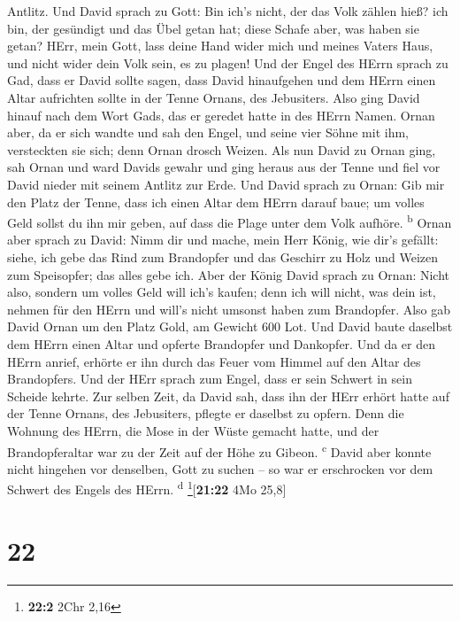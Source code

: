 Antlitz.  Und David sprach zu Gott: Bin ich's nicht, der
das Volk zählen hieß? ich bin, der gesündigt und das Übel getan hat;
diese Schafe aber, was haben sie getan? HErr, mein Gott, lass deine Hand
wider mich und meines Vaters Haus, und nicht wider dein Volk sein, es zu
plagen!  Und der Engel des HErrn sprach zu Gad, dass er
David sollte sagen, dass David hinaufgehen und dem HErrn einen Altar
aufrichten sollte in der Tenne Ornans, des Jebusiters. 
Also ging David hinauf nach dem Wort Gads, das er geredet hatte in des
HErrn Namen.  Ornan aber, da er sich wandte und sah den
Engel, und seine vier Söhne mit ihm, versteckten sie sich; denn Ornan
drosch Weizen.  Als nun David zu Ornan ging, sah Ornan
und ward Davids gewahr und ging heraus aus der Tenne und fiel vor David
nieder mit seinem Antlitz zur Erde.  Und David sprach zu
Ornan: Gib mir den Platz der Tenne, dass ich einen Altar dem HErrn
darauf baue; um volles Geld sollst du ihn mir geben, auf dass die Plage
unter dem Volk aufhöre. \textsuperscript{b}  Ornan aber
sprach zu David: Nimm dir und mache, mein Herr König, wie dir's gefällt:
siehe, ich gebe das Rind zum Brandopfer und das Geschirr zu Holz und
Weizen zum Speisopfer; das alles gebe ich.  Aber der
König David sprach zu Ornan: Nicht also, sondern um volles Geld will
ich's kaufen; denn ich will nicht, was dein ist, nehmen für den HErrn
und will's nicht umsonst haben zum Brandopfer.  Also gab
David Ornan um den Platz Gold, am Gewicht 600 Lot.  Und
David baute daselbst dem HErrn einen Altar und opferte Brandopfer und
Dankopfer. Und da er den HErrn anrief, erhörte er ihn durch das Feuer
vom Himmel auf den Altar des Brandopfers.  Und der HErr
sprach zum Engel, dass er sein Schwert in sein Scheide kehrte.
 Zur selben Zeit, da David sah, dass ihn der HErr erhört
hatte auf der Tenne Ornans, des Jebusiters, pflegte er daselbst zu
opfern.  Denn die Wohnung des HErrn, die Mose in der
Wüste gemacht hatte, und der Brandopferaltar war zu der Zeit auf der
Höhe zu Gibeon. \textsuperscript{c}  David aber konnte
nicht hingehen vor denselben, Gott zu suchen -- so war er erschrocken
vor dem Schwert des Engels des HErrn. \textsuperscript{d}
\footnote{\textbf{22:2} 2Chr 2,16}{[}\textbf{21:22} 4Mo 25,8{]}

\hypertarget{section-21}{%
\section{22}\label{section-21}}

